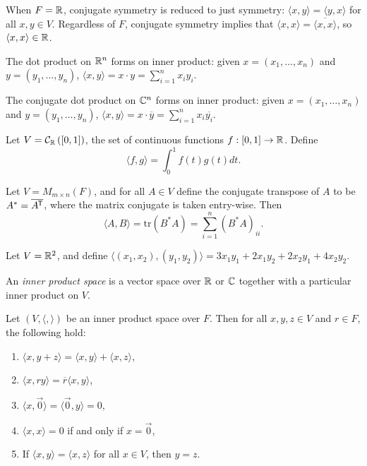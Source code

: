 \begin{rmk}
    When $F = \mathbb{R}$, conjugate symmetry is reduced to just symmetry: $\langle x, y\rangle = \langle y, x \rangle$ for all $x, y \in V$. Regardless of $F$, conjugate symmetry implies that $\langle x, x\rangle = \overline{\langle x, x\rangle}$, so $\langle x, x\rangle \in \mathbb{R}$.
\end{rmk}

\begin{exmp}
    The dot product on $\mathbb{R}^n$ forms on inner product: given $x = (x_1, \ldots, x_n)$ and $y = (y_1, \ldots, y_n)$, $\langle x, y\rangle = x \cdot y = \sum_{i=1}^{n}x_iy_i$.
\end{exmp}

\begin{exmp}
    The conjugate dot product on $\mathbb{C}^n$ forms on inner product: given $x = (x_1, \ldots, x_n)$ and $y = (y_1, \ldots, y_n)$, $\langle x, y\rangle = x \cdot \overline{y} = \sum_{i=1}^{n}x_i\overline{y_i}$.
\end{exmp}

\begin{exmp}
    Let $V = \mathcal{C}_{\mathbb{R}}\left([0, 1]\right)$, the set of continuous functions $f: [0, 1] \to \mathbb{R}$. Define
    \[\langle f, g \rangle = \int_0^1 f(t)g(t)dt.\]
\end{exmp}

\begin{exmp}
    Let $V = M_{m \times n}(F)$, and for all $A \in V$ define the conjugate transpose of $A$ to be $A^* = \overline{{A}^{\mkern-1.5mu\mathsf{T}}}$, where the matrix conjugate is taken entry-wise. Then
    \[\langle A, B \rangle = \textrm{tr}(B^*A) = \sum_{i=1}^{n}(B^*A)_{ii}.\]
\end{exmp}

\begin{exmp}
    Let $V = \mathbb{R}^2$, and define $\langle (x_1, x_2), (y_1, y_2) \rangle = 3x_1y_1 + 2x_1y_2 + 2x_2y_1 + 4x_2y_2$.
\end{exmp}

\begin{defn}
    An \emph{inner product space} is a vector space over $\mathbb{R}$ or $\mathbb{C}$ together with a particular inner product on $V$.
\end{defn}

\begin{thm}\label{inner-product-properties}
    Let $(V, \langle,\rangle)$ be an inner product space over $F$. Then for all $x, y, z \in V$ and $r \in F$, the following hold:
    \begin{enumerate}[label=(\arabic*)]
        \item $\langle x, y+z \rangle = \langle x, y \rangle + \langle x, z \rangle$,
        \item $\langle x, ry \rangle = \overline{r}\langle x, y \rangle$,
        \item $\langle x, \vec{0} \rangle = \langle \vec{0}, y \rangle = 0$,
        \item $\langle x, x \rangle = 0$ if and only if $x = \vec{0}$,
        \item If $\langle x, y \rangle = \langle x, z \rangle$ for all $x \in V$, then $y = z$.
    \end{enumerate}
\end{thm}

